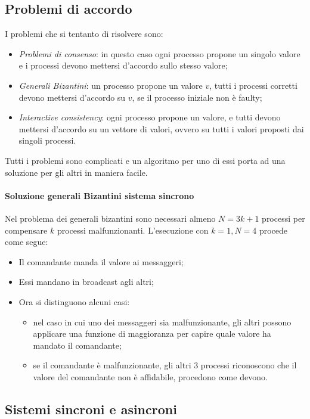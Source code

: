 \subsection{Problemi di accordo}
I problemi che si tentanto di risolvere sono:
\begin{itemize}
    \item \emph{Problemi di consenso}: in questo caso ogni processo 
    propone un singolo valore e i processi devono mettersi d'accordo 
    sullo stesso valore;
    \item \emph{Generali Bizantini}: un processo propone un valore $v$, 
    tutti i processi corretti devono mettersi d'accordo su $v$, se 
    il processo iniziale non è faulty;
    \item \emph{Interactive consistency}: ogni processo propone un valore, 
    e tutti devono mettersi d'accordo su un vettore di valori, 
    ovvero su tutti i valori proposti dai singoli processi.
\end{itemize}

Tutti i problemi sono complicati e un algoritmo per uno di essi 
porta ad una soluzione per gli altri in maniera facile.

\paragraph{Soluzione generali Bizantini sistema sincrono}
Nel problema dei generali bizantini sono necessari almeno 
$N = 3k + 1$ processi per compensare $k$ processi malfunzionanti.
L'esecuzione con $k = 1, N = 4$ procede come segue: 
\begin{itemize}
    \item Il comandante manda il valore ai messaggeri;
    \item Essi mandano in broadcast agli altri;
    \item Ora si distinguono alcuni casi:
    \begin{itemize}
        \item nel caso in cui uno dei messaggeri sia malfunzionante, 
        gli altri possono applicare una funzione di maggioranza 
        per capire quale valore ha mandato il comandante;
        \item se il comandante è malfunzionante, gli altri 3 processi 
        riconoscono che il valore del comandante non è affidabile, 
        procedono come devono.
    \end{itemize}
\end{itemize}

\subsection{Sistemi sincroni e asincroni}

